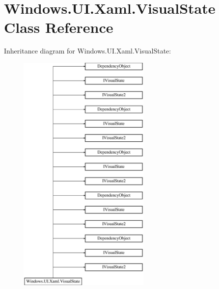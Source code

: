 \hypertarget{class_windows_1_1_u_i_1_1_xaml_1_1_visual_state}{}\section{Windows.\+U\+I.\+Xaml.\+Visual\+State Class Reference}
\label{class_windows_1_1_u_i_1_1_xaml_1_1_visual_state}
Inheritance diagram for Windows.\+U\+I.\+Xaml.\+Visual\+State\+:\begin{figure}[H]
\begin{center}
\leavevmode
\includegraphics[height=12.000000cm]{class_windows_1_1_u_i_1_1_xaml_1_1_visual_state}
\end{center}
\end{figure}
